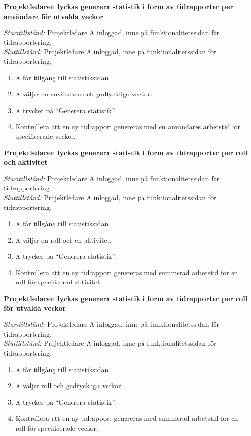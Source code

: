\documentclass[a4paper]{article}
\begin{document}
\begin{FT}
\item
\textbf{Projektledaren lyckas generera statistik i form av tidrapporter per användare för utvalda veckor}

\emph{Starttillstånd:} Projektledare A inloggad, inne på funktionalitetssidan för tidrapportering.\\
\emph{Sluttillstånd:} Projektledare A inloggad, inne på funktionalitetssidan för tidrapportering.

\begin{enumerate}
\item A får tillgång till statistiksidan.
\item A väljer en användare och godtyckliga veckor.
\item A trycker på ``Generera statistik''.
\item Kontrollera att en ny tidrapport genereras med en användares arbetstid för specificerade veckor.
\end{enumerate}


\item
\textbf{Projektledaren lyckas generera statistik i form av tidrapporter per roll och aktivitet}

\emph{Starttillstånd:} Projektledare A inloggad, inne på funktionalitetssidan för tidrapportering.\\
\emph{Sluttillstånd:} Projektledare A inloggad, inne på funktionalitetssidan för tidrapportering.

\begin{enumerate}
\item A får tillgång till statistiksidan.
\item A väljer en roll och en aktivitet.
\item A trycker på ``Generera statistik''.
\item Kontrollera att en ny tidrapport genereras med summerad arbetstid för en roll för specificerad aktivitet.
\end{enumerate}


\item
\textbf{Projektledaren lyckas generera statistik i form av tidrapporter per roll för utvalda veckor}

\emph{Starttillstånd:} Projektledare A inloggad, inne på funktionalitetssidan för tidrapportering.\\
\emph{Sluttillstånd:} Projektledare A inloggad, inne på funktionalitetssidan för tidrapportering.

\begin{enumerate}
\item A får tillgång till statistiksidan.
\item A väljer roll och godtyckliga veckor.
\item A trycker på ``Generera statistik''.
\item Kontrollera att en ny tidrapport genereras med summerad arbetstid för en roll för specificerade veckor.
\end{enumerate}



\end{FT}
\end{document}

